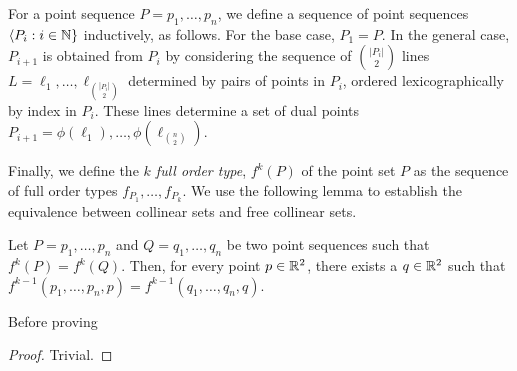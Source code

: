 \documentclass{patmorin}
\begin{document}
For a point sequence $P=p_1,\ldots,p_n$, we define a sequence
of point sequences $\langle P_i:i\in \mathbb{N}\}$ inductively,
as follows.  For the base case, $P_1=P$. In the general case,
$P_{i+1}$ is obtained from $P_{i}$ by considering the sequence of
$\binom{|P_i|}{2}$ lines $L=\ell_1,\ldots,\ell_{\binom{|P_i|}{2}}$
determined by pairs of points in $P_i$, ordered lexicographically
by index in $P_i$.  These lines determine a set of dual points
$P_{i+1}=\phi(\ell_1),\ldots,\phi(\ell_{\binom{n}{2}})$.

Finally, we define the \emph{$k$ full order type}, $f^k(P)$ of the point set $P$
as the sequence of full order types $f_{P_1},\ldots,f_{P_k}$.
We use the following lemma to establish the equivalence between collinear sets and free collinear sets.

\begin{lem}
   Let $P=p_1,\ldots,p_n$ and $Q=q_1,\ldots,q_n$ be two point sequences
   such that  $f^k(P)=f^{k}(Q)$.  Then, for every point $p\in \mathbb{R}^2$,
   there exists a $q\in\mathbb{R}^2$ such that $f^{k-1}(p_1,\ldots,p_n,p) =
   f^{k-1}(q_1,\ldots,q_n,q)$.
\end{lem}

Before proving 

\begin{proof}
   Trivial.
\end{proof}
\end{document}
